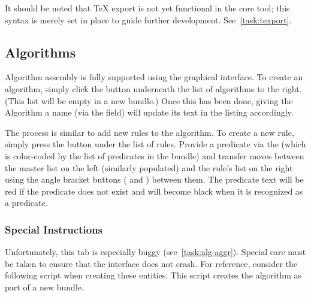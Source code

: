 It should be noted that {\TeX} export is not yet functional in the core tool;
  this syntax is merely set in place to guide further development.
See~\autoref{task:texport}.
\subsection{Algorithms}

Algorithm assembly is fully supported using the graphical interface.
To create an algorithm, simply click the  button
  underneath the list of algorithms to the right.
(This list will be empty in a new bundle.)
Once this has been done, giving the Algorithm a name (via the  field)
  will update its text in the listing accordingly.

The process is similar to add new rules to the algorithm.
To create a new rule, simply press the  button under the list of rules.
Provide a predicate via the 
  (which is color-coded by the list of predicates in the bundle)
  and transfer moves between the master list on the left (similarly populated) and the rule's list on the right
  using the angle bracket buttons (\menu{{>}} and \menu{{<}}) between them.
The predicate text will be red if the predicate does not exist
  and will become black when it is recognized as a predicate.

\subsubsection{Special Instructions}

Unfortunately, this tab is especially buggy (see~\autoref{task:alg-aggr}).
Special care must be taken to ensure that the interface does not crash.
For reference, consider the following script when creating these entities.
This script creates the algorithm  as part of a new bundle.

